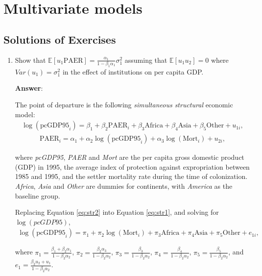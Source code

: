 \chapter{Multivariate models}\label{chap7}

\section{Solutions of Exercises}\label{sec71}
\begin{enumerate}[leftmargin=*]

	\item Show that $\mathbb{E}[u_1\text{PAER}]=\frac{\alpha_1}{1-\beta_1\alpha_1}\sigma^2_1$ assuming that $\mathbb{E}[u_1u_2]=0$ where $Var(u_1)=\sigma^2_1$ in the effect of institutions on per capita GDP.
	
	\textbf{Answer}:
	
	The point of departure is the following \textit{simultaneous structural} economic model:
	\begin{align}\label{eq:str1}
		\log(\text{pcGDP95}_i)=\beta_1+\beta_2\text{PAER}_i+\beta_3 \text{Africa}+\beta_4 \text{Asia}+\beta_5 \text{Other}+u_{1i},
	\end{align}
	\begin{align}\label{eq:str2}
		\text{PAER}_i=\alpha_1+\alpha_2\log(\text{pcGDP95}_i)+\alpha_3\log(\text{Mort}_i)+u_{2i},
	\end{align}

where \textit{pcGDP95}, \textit{PAER} and \textit{Mort} are the per capita gross domestic product (GDP) in 1995, the average index of protection against expropriation between 1985 and 1995, and the settler mortality rate during the time of colonization. \textit{Africa}, \textit{Asia} and \textit{Other} are dummies for continents, with \textit{America} as the baseline group.

Replacing Equation \ref{eq:str2} into Equation \ref{eq:str1}, and solving for $\log(\textit{pcGDP95})$,
\begin{align}\label{eq:red1}
	\log(\text{pcGDP95}_i)=\pi_1+\pi_2\log(\text{Mort}_i)+\pi_3 \text{Africa}+\pi_4 \text{Asia}+\pi_5 \text{Other}+e_{1i},   
\end{align}

where $\pi_1=\frac{\beta_1+\beta_2\alpha_1}{1-\beta_2\alpha_2}$, $\pi_2=\frac{\beta_2\alpha_3}{1-\beta_2\alpha_2}$, $\pi_3=\frac{\beta_3}{1-\beta_2\alpha_2}$, $\pi_4=\frac{\beta_4}{1-\beta_2\alpha_2}$, 
$\pi_5=\frac{\beta_5}{1-\beta_2\alpha_2}$, and $e_1=\frac{\beta_2u_2+u_1}{1-\beta_2\alpha_2}$.


\end{enumerate}
